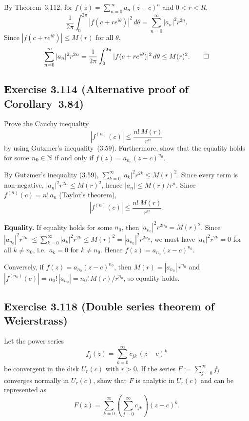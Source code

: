 \documentclass{article}
\begin{document}
\begin{solution}
  By Theorem~3.112, for $f(z) = \sum_{n=0}^{\infty} a_n(z-c)^n$
  and $0 < r < R$,
  \[
    \frac{1}{2\pi}\int_0^{2\pi}|f(c+re^{i\theta})|^2\,d\theta
    = \sum_{n=0}^{\infty}|a_n|^2 r^{2n}.
  \]
  Since $|f(c+re^{i\theta})| \le M(r)$ for all $\theta$,
  \[
    \sum_{n=0}^{\infty}|a_n|^2 r^{2n}
    = \frac{1}{2\pi}\int_0^{2\pi}|f(c+re^{i\theta})|^2\,d\theta
    \le M(r)^2.\qedhere
  \]
\end{solution}

\subsection{Exercise 3.114 (Alternative proof of Corollary~3.84)}

Prove the Cauchy inequality
\[
  |f^{(n)}(c)| \le \frac{n!\,M(r)}{r^n}
\]
by using Gutzmer's inequality~(3.59).
Furthermore, show that the equality holds for some
$n_0 \in \mathbb{N}$ if and only if $f(z) = a_{n_0}(z-c)^{n_0}$.

\begin{solution}
  By Gutzmer's inequality (3.59),
  $\sum_{k=0}^{\infty}|a_k|^2 r^{2k} \le M(r)^2$.
  Since every term is non-negative,
  $|a_n|^2 r^{2n} \le M(r)^2$, hence
  $|a_n| \le M(r)/r^n$.
  Since $f^{(n)}(c) = n!\,a_n$ (Taylor's theorem),
  \[
    |f^{(n)}(c)| \le \frac{n!\,M(r)}{r^n}.
  \]

  \textbf{Equality.}\;
  If equality holds for some $n_0$, then
  $|a_{n_0}|^2 r^{2n_0} = M(r)^2$.
  Since $|a_{n_0}|^2 r^{2n_0} \le \sum_{k=0}^{\infty}|a_k|^2 r^{2k}
  \le M(r)^2 = |a_{n_0}|^2 r^{2n_0}$,
  we must have $|a_k|^2 r^{2k} = 0$ for all $k \ne n_0$,
  i.e.\ $a_k = 0$ for $k \ne n_0$.
  Hence $f(z) = a_{n_0}(z-c)^{n_0}$.

  Conversely, if $f(z) = a_{n_0}(z-c)^{n_0}$, then
  $M(r) = |a_{n_0}|\,r^{n_0}$ and
  $|f^{(n_0)}(c)| = n_0!\,|a_{n_0}| = n_0!\,M(r)/r^{n_0}$,
  so equality holds.\qedhere
\end{solution}

\subsection{Exercise 3.118 (Double series theorem of Weierstrass)}

Let the power series
\[
  f_j(z) = \sum_{k=0}^{\infty} c_{jk}\,(z-c)^k
\]
be convergent in the disk $U_r(c)$ with $r > 0$.
If the series $F := \sum_{j=0}^{\infty} f_j$ converges normally
in $U_r(c)$, show that $F$ is analytic in $U_r(c)$ and can be
represented as
\[
  F(z) = \sum_{k=0}^{\infty}
  \left(\sum_{j=0}^{\infty} c_{jk}\right)(z-c)^k.
\]
\end{document}
